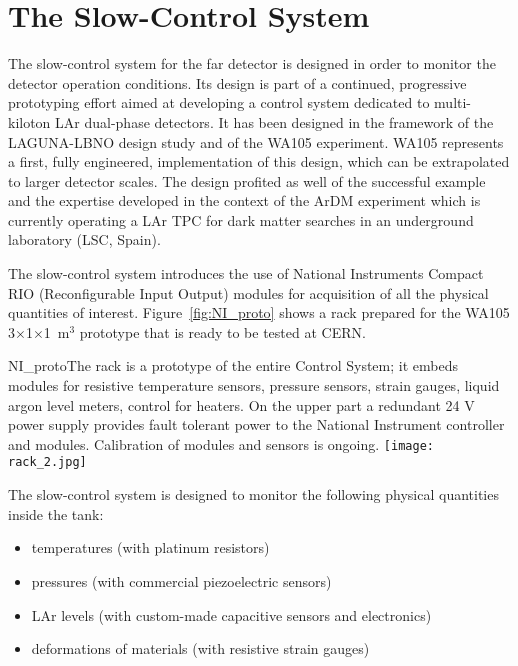 \section{The Slow-Control System} 
\label{sec:detectors-fd-alt-dcs}

The slow-control system for the far detector is designed in order to
monitor the detector operation conditions. Its design is part of a
continued, progressive prototyping effort aimed at developing a
control system dedicated to multi-kiloton LAr dual-phase detectors. It
has been designed in the framework of the LAGUNA-LBNO design study and
of the WA105 experiment. WA105 represents a first, fully engineered,
implementation of this design, which can be extrapolated to larger
detector scales. The design profited as well of the successful example
and the expertise developed in the context of the ArDM
experiment\cite{Badertscher:2013ygt} which is currently operating a
LAr TPC for dark matter searches in an underground laboratory (LSC,
Spain).

The slow-control system introduces the use of National Instruments
Compact RIO (Reconfigurable Input Output) modules for acquisition of
all the physical quantities of interest.  Figure~\ref{fig:NI_proto}
shows a rack prepared for the WA105 3$\times$1$\times$1~m$^3$
prototype that is ready to be tested at CERN.
\begin{cdrfigure}{NI_proto}{The rack is a  prototype of the entire Control System; it  embeds modules for resistive 
temperature sensors, pressure  sensors, strain gauges, liquid argon level  meters, control for  heaters. On the upper part a redundant 24 V power supply 
provides fault tolerant power to the National Instrument controller and modules.  Calibration of modules and sensors is ongoing.}
\texttt{[image: rack\_2.jpg]}
\end{cdrfigure}

The slow-control system is designed to monitor the following physical
quantities inside the tank:
\begin{itemize}
 \item temperatures (with platinum resistors)
 \item pressures (with commercial piezoelectric sensors)
 \item LAr levels (with custom-made capacitive sensors and electronics)
 \item deformations of materials (with resistive strain gauges)
\end{itemize} 

